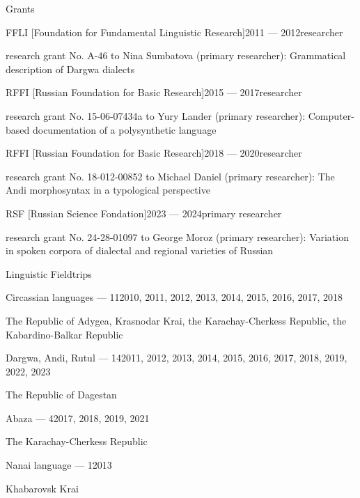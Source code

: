\documentclass{resume} %
\begin{document}
\begin{rSection}{Grants}
\begin{rSubsection}{FFLI [Foundation for Fundamental Linguistic Research]}{2011 --- 2012}{researcher}{}
\item research grant No. A-46 to Nina Sumbatova (primary researcher): Grammatical description of Dargwa dialects
\end{rSubsection}
\begin{rSubsection}{RFFI [Russian Foundation for Basic Research]}{2015 --- 2017}{researcher}{}
\item research grant No. 15-06-07434a to Yury Lander (primary researcher): Computer-based documentation of a polysynthetic language
\end{rSubsection}
\begin{rSubsection}{RFFI [Russian Foundation for Basic Research]}{2018 --- 2020}{researcher}{}
\item research grant No. 18-012-00852 to Michael Daniel (primary researcher): The Andi morphosyntax in a typological perspective
\end{rSubsection}
\begin{rSubsection}{RSF [Russian Science Fondation]}{2023 --- 2024}{primary researcher}{}
\item research grant No. 24-28-01097 to George Moroz (primary researcher): Variation in spoken corpora of dialectal and regional varieties of Russian
\end{rSubsection}
\end{rSection}

\begin{rSection}{Linguistic Fieldtrips}

\begin{rSubsection}{Circassian languages --- 11}{2010, 2011, 2012, 2013, 2014, 2015, 2016, 2017, 2018}{}{}
\item The Republic of Adygea, Krasnodar Krai, the Karachay-Cherkess Republic, the Kabardino-Balkar Republic
\end{rSubsection}
\begin{rSubsection}{Dargwa, Andi, Rutul --- 14}{2011, 2012, 2013, 2014, 2015, 2016, 2017, 2018, 2019, 2022, 2023}{}{}
\item The Republic of Dagestan
\end{rSubsection}
\begin{rSubsection}{Abaza --- 4}{2017, 2018, 2019, 2021}{}{}
\item The Karachay-Cherkess Republic
\end{rSubsection}
\begin{rSubsection}{Nanai language --- 1}{2013}{}{}
\item Khabarovsk Krai
\end{rSubsection}
\end{rSection}
\end{document}

